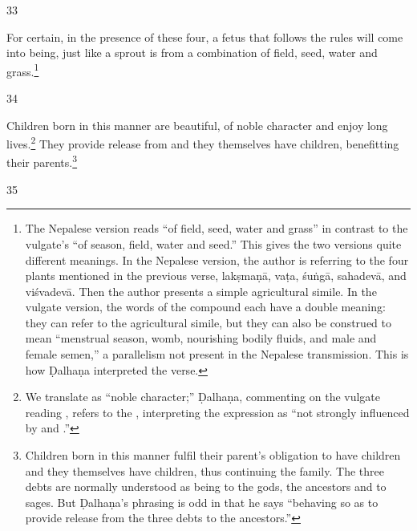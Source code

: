 \begin{translation}
\item[33]

\begin{sloka}
    For certain, in the presence of these four, a fetus that follows
the rules will come into being, just like a sprout is from a
combination of field, seed, water and grass.\footnote{The Nepalese
    version reads  “of field, seed, water
    and grass” in contrast to the vulgate's 
    “of season, field, water and seed.” This gives the two versions
    quite different meanings. In the Nepalese version, the author is
    referring to the four plants mentioned in the previous verse,
    \gls{lakṣmaṇā}, \gls{vaṭa}, \gls{śuṅgā}, \gls{sahadevā}, and
    \gls{viśvadevā}.  Then the author presents a simple agricultural
    simile.  In the vulgate version, the words of the compound each
    have a double meaning: they can refer to the agricultural simile,
    but they can also be construed to mean “menstrual season, womb,
    nourishing bodily fluids, and male and female semen,” a
    parallelism not present in the Nepalese transmission.   This is
    how Ḍalhaṇa interpreted the verse.}
\end{sloka}

\item[34] 

Children born in this manner are beautiful, of noble character and
enjoy long lives.\footnote{We translate  as “noble
    character;” Ḍalhaṇa, commenting on the vulgate reading
    , refers to the , interpreting the
    expression as “not strongly influenced by  and
    .”}  They provide release from  and
    they themselves have children, benefitting their parents.\footnote{Children 
    born in this manner
        fulfil their parent's obligation to have children and they themselves
        have children, thus continuing the family.  The three debts are
        normally understood as being to the gods, the ancestors and to sages.
        But Ḍalhaṇa's phrasing is odd in that he says
         “behaving so as to provide release
        from the three debts to the ancestors.”} 

\item[35]


\end{translation}

